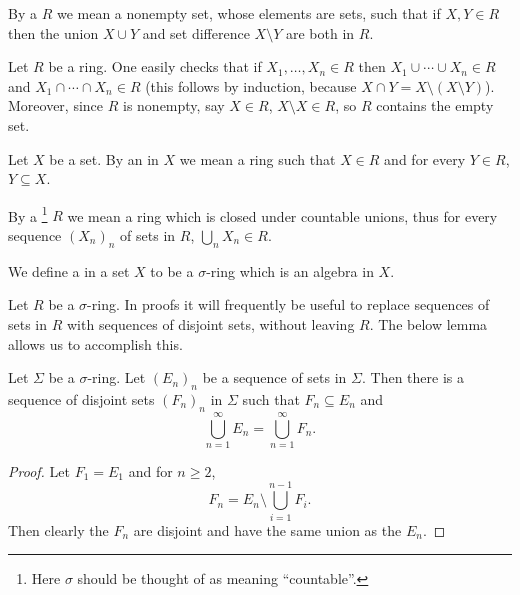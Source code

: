 \begin{definition}
By a  $R$ we mean a nonempty set, whose elements are sets, such that if $X, Y \in R$ then the union $X \cup Y$ and set difference $X \setminus Y$ are both in $R$.
\end{definition}

\begin{subsec}
Let $R$ be a ring.
One easily checks that if $X_{1}, \dots, X_{n} \in R$ then $X_{1} \cup \cdots \cup X_{n} \in R$ and $X_{1} \cap \cdots \cap X_{n} \in R$ (this follows by induction, because $X \cap Y = X \setminus (X \setminus Y)$).
Moreover, since $R$ is nonempty, say $X \in R$, $X \setminus X \in R$, so $R$ contains the empty set.
\end{subsec}

\begin{definition}
Let $X$ be a set. By an  in $X$ we mean a ring such that $X \in R$ and for every $Y \in R$, $Y \subseteq X$.
\end{definition}

\begin{definition}
By a \footnote{Here $\sigma$ should be thought of as meaning ``countable''.} $R$ we mean a ring which is closed under countable unions, thus for every sequence ${(X_{n})}_{n}$ of sets in $R$, $\bigcup_{n} X_{n} \in R$.

We define a  in a set $X$ to be a $\sigma$-ring which is an algebra in $X$.
\end{definition}

\begin{subsec}
Let $R$ be a $\sigma$-ring.
In proofs it will frequently be useful to replace sequences of sets in $R$ with sequences of disjoint sets, without leaving $R$.
The below lemma allows us to accomplish this.
\end{subsec}

\begin{lemma}
Let $\Sigma$ be a $\sigma$-ring.
Let ${(E_{n})}_{n}$ be a sequence of sets in $\Sigma$. Then there is a sequence of disjoint sets ${(F_{n})}_{n}$ in $\Sigma$ such that $F_{n} \subseteq E_{n}$ and
\[\bigcup_{n=1}^{\infty} E_{n} = \bigcup_{n=1}^{\infty} F_{n}.\]
\end{lemma}
\begin{proof}
Let $F_{1} = E_{1}$ and for $n \geq 2$,
\[F_{n} = E_{n} \setminus \bigcup_{i=1}^{n-1} F_{i}.\]
Then clearly the $F_{n}$ are disjoint and have the same union as the $E_{n}$.
\end{proof}

